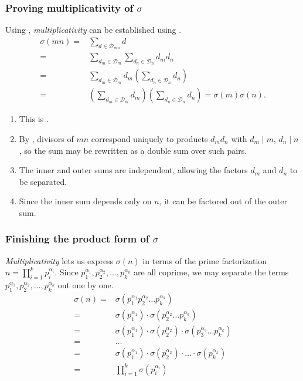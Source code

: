 \documentclass[a4paper, 12pt]{article}
\theoremstyle{definition}
\begin{document}
\subsubsection*{Proving multiplicativity of $\sigma$}
Using \textbf{}, \textit{multiplicativity} can be established using \textbf{}.
\begin{align}
\sigma(mn) =&\sum_{d\in \mathcal{D}_{mn}} d\\
=&\sum_{d_m \in \mathcal{D}_m}\sum_{d_n \in \mathcal{D}_n} d_m d_n\\
=&\sum_{d_m \in \mathcal{D}_m} d_m \left(\sum_{d_n \in \mathcal{D}_n} d_n\right)\\
=&\left(\sum_{d_m \in \mathcal{D}_m} d_m\right)\left(\sum_{d_n \in \mathcal{D}_n} d_n\right)=\sigma(m)\sigma(n).
\end{align}
\vspace{-1em}\begin{enumerate}[label=(4.\arabic*), start=6]
  \item This is \textbf{}.
  \item By \textbf{}, divisors of $mn$ correspond uniquely to products $d_m d_n$ with $d_m\mid m$, $d_n\mid n$, so the sum may be rewritten as a double sum over such pairs.
  \item The inner and outer sums are independent, allowing the factors $d_m$ and $d_n$ to be separated.
  \item Since the inner sum depends only on $n$, it can be factored out of the outer sum.
\end{enumerate}

\subsubsection*{Finishing the product form of $\sigma$}
\textit{Multiplicativity} lets us express $\sigma(n)$ in terms of the prime factorization
$n=\prod_{i=1}^{k}p_i^{\alpha_i}$.
Since $p_1^{\alpha_1}, p_2^{\alpha_2}, \dots, p_k^{\alpha_k}$ are all coprime,
we may separate the terms $p_1^{\alpha_1}, p_2^{\alpha_2}, \dots, p_k^{\alpha_k}$
out one by one.
\begin{align}
  \sigma(n) = &\sigma(p_1^{\alpha_1}p_2^{\alpha_2} \dots p_k^{\alpha_k})\label{eq:sigma_apply_s}\\
  = &\sigma(p_1^{\alpha_1}) \cdot \sigma(p_2^{\alpha_2} \dots p_k^{\alpha_k})\\
  = &\sigma(p_1^{\alpha_1}) \cdot \sigma(p_2^{\alpha_2}) \cdot \sigma(p_3^{\alpha_3} \dots p_k^{\alpha_k})\\
  = &\dots\\
  = &\sigma(p_1^{\alpha_1}) \cdot \sigma(p_2^{\alpha_2}) \cdot \dots \cdot \sigma(p_k^{\alpha_k})\\
  = &\prod_{i=1}^{k}\sigma(p_i^{\alpha_i}) \label{eq:sigma_apply_e}
\end{align}
\end{document}

